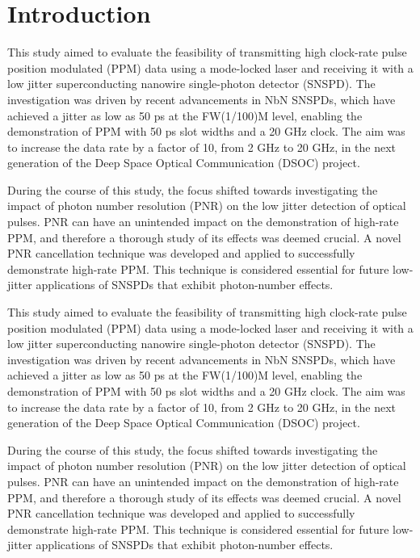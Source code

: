\documentclass[11pt]{caltech_thesis} %
\begin{document}
\hypertarget{introduction-3}{%
\section{Introduction}\label{introduction-3}}

\protect\hypertarget{..ux2fcodeux2ftest_1}{}{}

This study aimed to evaluate the feasibility of transmitting high
clock-rate pulse position modulated (PPM) data using a mode-locked laser
and receiving it with a low jitter superconducting nanowire
single-photon detector (SNSPD). The investigation was driven by recent
advancements in NbN SNSPDs, which have achieved a jitter as low as 50 ps
at the FW(1/100)M level, enabling the demonstration of PPM with 50 ps
slot widths and a 20 GHz clock. The aim was to increase the data rate by
a factor of 10, from 2 GHz to 20 GHz, in the next generation of the Deep
Space Optical Communication (DSOC) project.

During the course of this study, the focus shifted towards investigating
the impact of photon number resolution (PNR) on the low jitter detection
of optical pulses. PNR can have an unintended impact on the
demonstration of high-rate PPM, and therefore a thorough study of its
effects was deemed crucial. A novel PNR cancellation technique was
developed and applied to successfully demonstrate high-rate PPM. This
technique is considered essential for future low-jitter applications of
SNSPDs that exhibit photon-number effects.

This study aimed to evaluate the feasibility of transmitting high
clock-rate pulse position modulated (PPM) data using a mode-locked laser
and receiving it with a low jitter superconducting nanowire
single-photon detector (SNSPD). The investigation was driven by recent
advancements in NbN SNSPDs, which have achieved a jitter as low as 50 ps
at the FW(1/100)M level, enabling the demonstration of PPM with 50 ps
slot widths and a 20 GHz clock. The aim was to increase the data rate by
a factor of 10, from 2 GHz to 20 GHz, in the next generation of the Deep
Space Optical Communication (DSOC) project.

During the course of this study, the focus shifted towards investigating
the impact of photon number resolution (PNR) on the low jitter detection
of optical pulses. PNR can have an unintended impact on the
demonstration of high-rate PPM, and therefore a thorough study of its
effects was deemed crucial. A novel PNR cancellation technique was
developed and applied to successfully demonstrate high-rate PPM. This
technique is considered essential for future low-jitter applications of
SNSPDs that exhibit photon-number effects.
\end{document}
